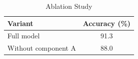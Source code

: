 \begin{table}[!t]
  \centering
  \caption{Ablation Study}
  \label{tab:ablation}
  \begin{tabular}{@{}lc@{}}
    \toprule
    Variant               & Accuracy (\%) \\
    \midrule
    Full model            & 91.3 \\
    Without component A   & 88.0 \\
    \bottomrule
  \end{tabular}
\end{table}
